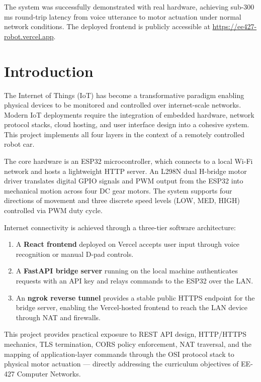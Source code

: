 \documentclass[12pt]{report}
\begin{document}
The system was successfully demonstrated with real hardware, achieving
sub-300\,ms round-trip latency from voice utterance to motor actuation under
normal network conditions. The deployed frontend is publicly accessible at
\url{https://ee427-robot.vercel.app}.


\chapter{Introduction}

The Internet of Things (IoT) has become a transformative paradigm enabling
physical devices to be monitored and controlled over internet-scale networks.
Modern IoT deployments require the integration of embedded hardware, network
protocol stacks, cloud hosting, and user interface design into a cohesive system.
This project implements all four layers in the context of a remotely controlled
robot car.

The core hardware is an ESP32 microcontroller, which connects to a local Wi-Fi
network and hosts a lightweight HTTP server. An L298N dual H-bridge motor driver
translates digital GPIO signals and PWM output from the ESP32 into mechanical
motion across four DC gear motors. The system supports four directions of
movement and three discrete speed levels (LOW, MED, HIGH) controlled via PWM
duty cycle.

Internet connectivity is achieved through a three-tier software architecture:
\begin{enumerate}
    \item A \textbf{React frontend} deployed on Vercel accepts user input
          through voice recognition or manual D-pad controls.
    \item A \textbf{FastAPI bridge server} running on the local machine
          authenticates requests with an API key and relays commands to the
          ESP32 over the LAN.
    \item An \textbf{ngrok reverse tunnel} provides a stable public HTTPS
          endpoint for the bridge server, enabling the Vercel-hosted frontend
          to reach the LAN device through NAT and firewalls.
\end{enumerate}

This project provides practical exposure to REST API design, HTTP/HTTPS mechanics,
TLS termination, CORS policy enforcement, NAT traversal, and the mapping of
application-layer commands through the OSI protocol stack to physical motor
actuation --- directly addressing the curriculum objectives of EE-427 Computer
Networks.
\end{document}

